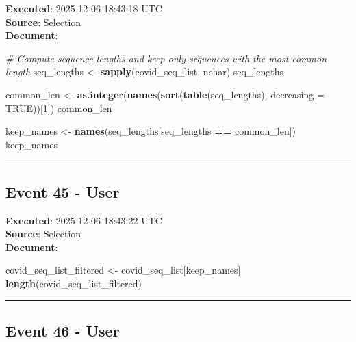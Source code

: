 \documentclass[
  11pt,
]{article}
\newenvironment{Shaded}{\begin{snugshade}}{\end{snugshade}}
\newcommand{\AttributeTok}[1]{\textcolor[rgb]{0.13,0.29,0.53}{#1}}
\newcommand{\CommentTok}[1]{\textcolor[rgb]{0.56,0.35,0.01}{\textit{#1}}}
\newcommand{\ConstantTok}[1]{\textcolor[rgb]{0.56,0.35,0.01}{#1}}
\newcommand{\DecValTok}[1]{\textcolor[rgb]{0.00,0.00,0.81}{#1}}
\newcommand{\FunctionTok}[1]{\textcolor[rgb]{0.13,0.29,0.53}{\textbf{#1}}}
\newcommand{\NormalTok}[1]{#1}
\newcommand{\OtherTok}[1]{\textcolor[rgb]{0.56,0.35,0.01}{#1}}
\newcommand{\SpecialCharTok}[1]{\textcolor[rgb]{0.81,0.36,0.00}{\textbf{#1}}}
\begin{document}
\textbf{Executed}: 2025-12-06 18:43:18 UTC\\
\textbf{Source}: Selection\\
\textbf{Document}:

\begin{Shaded}
\begin{Highlighting}[]
\CommentTok{\# Compute sequence lengths and keep only sequences with the most common length}
\NormalTok{seq\_lengths }\OtherTok{\textless{}{-}} \FunctionTok{sapply}\NormalTok{(covid\_seq\_list, nchar)}
\NormalTok{seq\_lengths}

\NormalTok{common\_len }\OtherTok{\textless{}{-}} \FunctionTok{as.integer}\NormalTok{(}\FunctionTok{names}\NormalTok{(}\FunctionTok{sort}\NormalTok{(}\FunctionTok{table}\NormalTok{(seq\_lengths), }\AttributeTok{decreasing =} \ConstantTok{TRUE}\NormalTok{))[}\DecValTok{1}\NormalTok{])}
\NormalTok{common\_len}

\NormalTok{keep\_names }\OtherTok{\textless{}{-}} \FunctionTok{names}\NormalTok{(seq\_lengths[seq\_lengths }\SpecialCharTok{==}\NormalTok{ common\_len])}
\NormalTok{keep\_names}
\end{Highlighting}
\end{Shaded}

\begin{center}\rule{0.5\linewidth}{0.5pt}\end{center}

\subsection{Event 45 - User}\label{event-45---user}

\textbf{Executed}: 2025-12-06 18:43:22 UTC\\
\textbf{Source}: Selection\\
\textbf{Document}:

\begin{Shaded}
\begin{Highlighting}[]
\NormalTok{covid\_seq\_list\_filtered }\OtherTok{\textless{}{-}}\NormalTok{ covid\_seq\_list[keep\_names]}
\FunctionTok{length}\NormalTok{(covid\_seq\_list\_filtered)}
\end{Highlighting}
\end{Shaded}

\begin{center}\rule{0.5\linewidth}{0.5pt}\end{center}

\subsection{Event 46 - User}\label{event-46---user}
\end{document}
